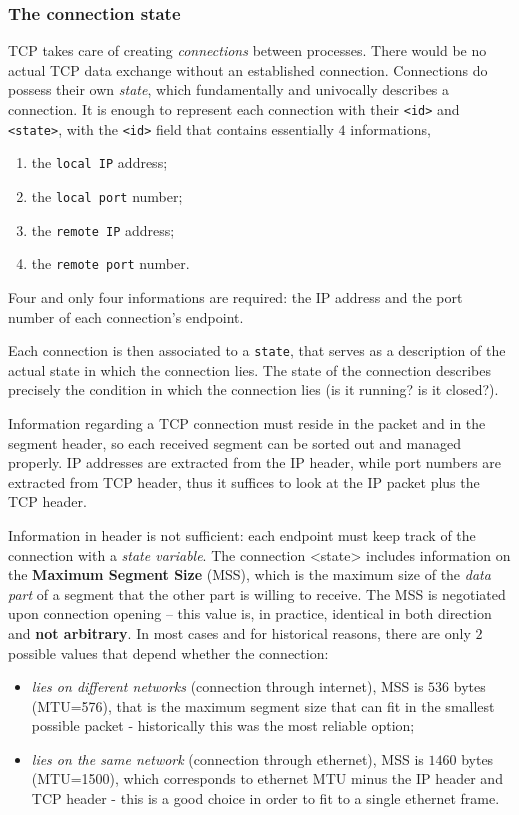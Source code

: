 \documentclass[10pt]{extreport}
\begin{document}
\subsubsection{The connection state}

TCP takes care of creating \emph{connections} between processes. There would be
no actual TCP data exchange without an established connection. Connections do
possess their own \emph{state}, which fundamentally and univocally describes a
connection. It is enough to represent each connection with their \texttt{<id>}
and \texttt{<state>}, with the \texttt{<id>} field that contains essentially
$4$ informations,
\begin{enumerate}
    \item the \texttt{local IP} address;
    \item the \texttt{local port} number;
    \item the \texttt{remote IP} address;
    \item the \texttt{remote port} number.
\end{enumerate}

Four and only four informations are required: the IP address and the
port number of each connection's endpoint.

Each connection is then associated to a \texttt{state}, that serves as a
description of the actual state in which the connection lies. The state of the
connection describes precisely the condition in which the connection lies (is
it running? is it closed?).

Information regarding a TCP connection must reside in the packet and in the segment
header, so each received segment can be sorted out and managed properly. IP
addresses are extracted from the IP header, while port numbers are extracted
from TCP header, thus it suffices to look at the IP packet plus the TCP header.

Information in header is not sufficient: each endpoint must keep track of the
connection with a \emph{state variable}. The connection <state> includes
information on the \textbf{Maximum Segment Size} (MSS), which is the maximum
size of the \emph{data part} of a segment that the other part is willing to
receive. The MSS is negotiated upon connection opening \--- this value is, in
practice, identical in both direction and \textbf{not arbitrary}. In most
cases and for historical reasons, there are only $2$ possible values that
depend whether the connection:

\begin{itemize}
    \item \emph{lies on different networks} (connection through internet), MSS
        is $536$ bytes (MTU=576), that is the maximum segment size that can fit
        in the smallest possible packet \-- historically this was the most
        reliable option;
    \item \emph{lies on the same network} (connection through ethernet), MSS is
        $1460$ bytes (MTU=1500), which corresponds to ethernet MTU minus the IP
        header and TCP header \-- this is a good choice in order to fit to a
        single ethernet frame.
\end{itemize}
\end{document}
